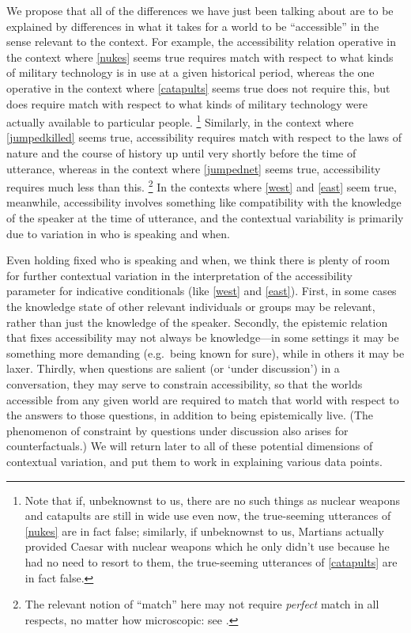 \documentclass[If.tex]{subfiles}
\begin{document}

We propose that all of the differences we have just been talking about are to be explained by differences in what it takes for a world to be “accessible” in the sense relevant to the context. For example, the accessibility relation operative in the context where \ref{nukes} seems true requires match with respect to what kinds of military technology is in use at a given historical period, whereas the one operative in the context where \ref{catapults} seems true does not require this, but does require match with respect to what kinds of military technology were actually available to particular people.%
\footnote{Note that if, unbeknownst to us, there are no such things as nuclear weapons and catapults are still in wide use even now, the true-seeming utterances of \ref{nukes} are in fact false; similarly, if unbeknownst to us, Martians actually provided Caesar with nuclear weapons which he only didn't use because he had no need to resort to them, the true-seeming utterances of \ref{catapults} are in fact false.}
Similarly, in the context where \ref{jumpedkilled} seems true, accessibility requires match with respect to the laws of nature and the course of history up until very shortly before the time of utterance, whereas in the context where \ref{jumpednet} seems true, accessibility requires much less than this.%
\footnote{The relevant notion of “match” here may not require \emph{perfect} match in all respects, no matter how microscopic: see \cite{DorrACM}.}
In the contexts where \ref{west} and \ref{east} seem true, meanwhile, accessibility involves something like compatibility with the knowledge of the speaker at the time of utterance, and the contextual variability is primarily due to variation in who is speaking and when.

Even holding fixed who is speaking and when, we think there is plenty of room for further contextual variation in the interpretation of the accessibility parameter for indicative conditionals (like \ref{west} and \ref{east}).  First, in some cases the knowledge state of other relevant individuals or groups may be relevant, rather than just the knowledge of the speaker.  Secondly, the epistemic relation that fixes accessibility may not always be knowledge---in some settings it may be something more demanding (e.g.\ being known for sure), while in others it may be laxer.   Thirdly, when questions are salient (or ‘under discussion’) in a conversation, they may serve to constrain accessibility, so that the worlds accessible from any given world are required to match that world with respect to the answers to those questions, in addition to being epistemically live.  (The phenomenon of constraint by questions under discussion also arises for counterfactuals.)  We will return later to all of these potential dimensions of contextual variation, and put them to work in explaining various data points.  
\end{document}
